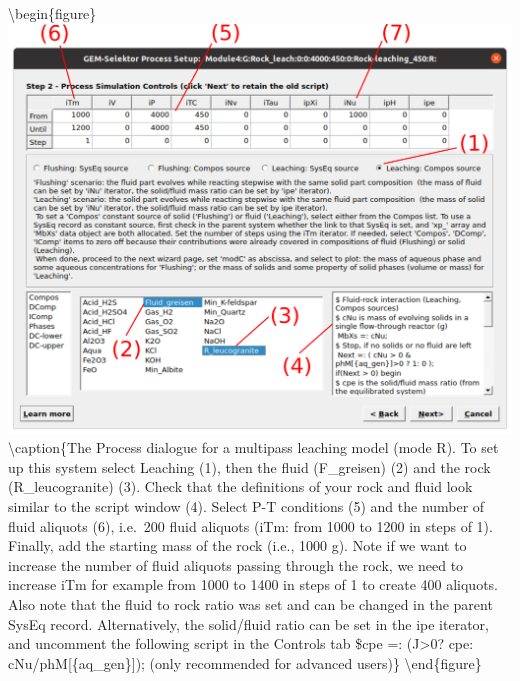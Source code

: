 \documentclass[
]{book}
\begin{document}
\textbackslash begin\{figure\}
\includegraphics[width=1\linewidth]{figures/module4/fig-6} \textbackslash caption\{The Process dialogue for a multipass leaching model (mode R). To set up this system select Leaching (1), then the fluid (F\_greisen) (2) and the rock (R\_leucogranite) (3). Check that the definitions of your rock and fluid look similar to the script window (4). Select P-T conditions (5) and the number of fluid aliquots (6), i.e.~200 fluid aliquots (iTm: from 1000 to 1200 in steps of 1). Finally, add the starting mass of the rock (i.e., 1000 g). Note if we want to increase the number of fluid aliquots passing through the rock, we need to increase iTm for example from 1000 to 1400 in steps of 1 to create 400 aliquots. Also note that the fluid to rock ratio was set and can be changed in the parent SysEq record. Alternatively, the solid/fluid ratio can be set in the ipe iterator, and uncomment the following script in the Controls tab \$cpe =: (J\textgreater0? cpe: cNu/phM{[}\{aq\_gen\}{]}); (only recommended for advanced users)\}\label{fig:fig-6d}
\textbackslash end\{figure\}
\end{document}
